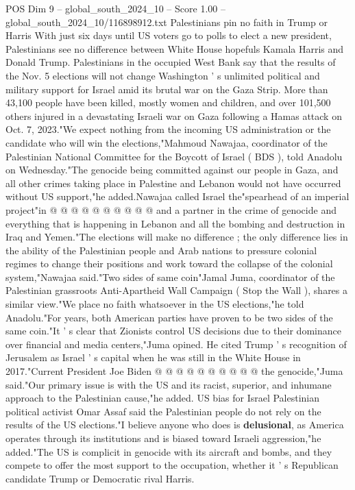 \begin{textsample}{POS Dim 9 – global\_south\_2024\_10 – Score 1.00 – global\_south\_2024\_10/116898912.txt}  \label{ex:f9_pos_169}
Palestinians pin no faith in Trump or Harris With just six days until US voters go to polls to elect a new president, Palestinians see no difference between White House hopefuls Kamala Harris and Donald Trump.
Palestinians in the occupied West Bank say that the results of the Nov. 5 elections will not change Washington ' s unlimited political and military support for Israel amid its brutal war on the Gaza Strip.
More than 43,100 people have been killed, mostly women and children, and over 101,500 others injured in a devastating Israeli war on Gaza following a Hamas attack on Oct. 7, 2023."We expect nothing from the incoming US administration or the candidate who will win the elections,"Mahmoud Nawajaa, coordinator of the Palestinian National Committee for the Boycott of Israel ( BDS ), told Anadolu on Wednesday."The genocide being committed against our people in Gaza, and all other crimes taking place in Palestine and Lebanon would not have occurred without US support,"he added.Nawajaa called Israel the"spearhead of an imperial project"in @ @ @ @ @ @ @ @ @ @ and a partner in the crime of genocide and everything that is happening in Lebanon and all the bombing and destruction in Iraq and Yemen."The elections will make no difference ; the only difference lies in the ability of the Palestinian people and Arab nations to pressure colonial regimes to change their positions and work toward the collapse of the colonial system,"Nawajaa said."Two sides of same coin"Jamal Juma, coordinator of the Palestinian grassroots Anti-Apartheid Wall Campaign ( Stop the Wall ), shares a similar view."We place no faith whatsoever in the US elections,"he told Anadolu."For years, both American parties have proven to be two sides of the same coin."It ' s clear that Zionists control US decisions due to their dominance over financial and media centers,"Juma opined.
He cited Trump ' s recognition of Jerusalem as Israel ' s capital when he was still in the White House in 2017."Current President Joe Biden @ @ @ @ @ @ @ @ @ @ the genocide,"Juma said."Our primary issue is with the US and its racist, superior, and inhumane approach to the Palestinian cause,"he added.
US bias for Israel Palestinian political activist Omar Assaf said the Palestinian people do not rely on the results of the US elections."I believe anyone who does is \textbf{delusional}, as America operates through its institutions and is biased toward Israeli aggression,"he added."The US is complicit in genocide with its aircraft and bombs, and they compete to offer the most support to the occupation, whether it ' s Republican candidate Trump or Democratic rival Harris.

\end{textsample}
